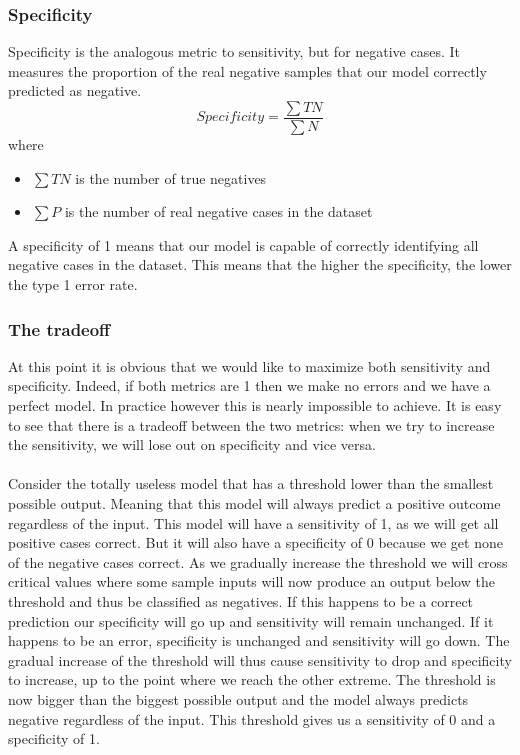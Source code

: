 \subsubsection{Specificity}
Specificity is the analogous metric to sensitivity, but for negative cases. It measures the proportion of the real negative samples that our model correctly predicted as negative.
$$
Specificity = \frac{\sum{TN}}{\sum{N}}
$$
where
\begin{itemize}
\item $\sum{TN}$ is the number of true negatives
\item $\sum{P}$ is the number of real negative cases in the dataset
\end{itemize}

A specificity of 1 means that our model is capable of correctly identifying all negative cases in the dataset. This means that the higher the specificity, the lower the type 1 error rate.
\subsubsection{The tradeoff}
At this point it is obvious that we would like to maximize both sensitivity and specificity. Indeed, if both metrics are 1 then we make no errors and we have a perfect model. In practice however this is nearly impossible to achieve. It is easy to see that there is a tradeoff between the two metrics: when we try to increase the sensitivity, we will lose out on specificity and vice versa. \\ \\ 
Consider the totally useless model that has a threshold lower than the smallest possible output. Meaning that this model will always predict a positive outcome regardless of the input. This model will have a sensitivity of 1, as we will get all positive cases correct. But it will also have a specificity of 0 because we get none of the negative cases correct. As we gradually increase the threshold we will cross critical values where some sample inputs will now produce an output below the threshold and thus be classified as negatives. If this happens to be a correct prediction our specificity will go up and sensitivity will remain unchanged. If it happens to be an error, specificity is unchanged and sensitivity will go down. The gradual increase of the threshold will thus cause sensitivity to drop and specificity to increase, up to the point where we reach the other extreme. The threshold is now bigger than the biggest possible output and the model always predicts negative regardless of the input. This threshold gives us a sensitivity of 0 and a specificity of 1.
